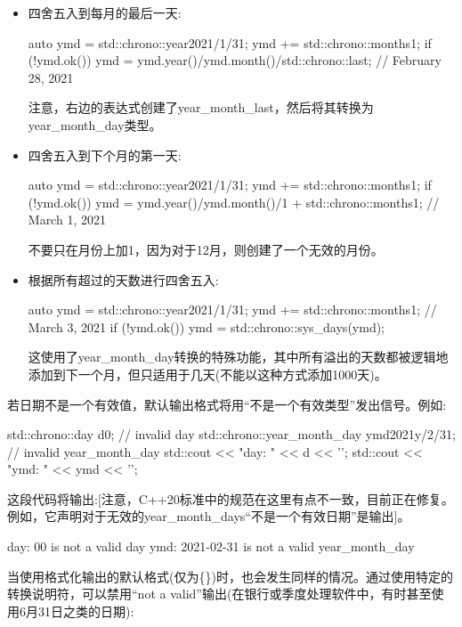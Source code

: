 \begin{itemize}
\item
四舍五入到每月的最后一天:

\begin{cpp}
auto ymd = std::chrono::year{2021}/1/31;
ymd += std::chrono::months{1};
if (!ymd.ok()) {
	ymd = ymd.year()/ymd.month()/std::chrono::last; // February 28, 2021
}
\end{cpp}

注意，右边的表达式创建了year\_month\_last，然后将其转换为year\_month\_day类型。

\item
四舍五入到下个月的第一天:

\begin{cpp}
auto ymd = std::chrono::year{2021}/1/31;
ymd += std::chrono::months{1};
if (!ymd.ok()) {
	ymd = ymd.year()/ymd.month()/1 + std::chrono::months{1}; // March 1, 2021
}
\end{cpp}

不要只在月份上加1，因为对于12月，则创建了一个无效的月份。

\item
根据所有超过的天数进行四舍五入:

\begin{cpp}
auto ymd = std::chrono::year{2021}/1/31;
ymd += std::chrono::months{1}; // March 3, 2021
if (!ymd.ok()) {
	ymd = std::chrono::sys_days(ymd);
}
\end{cpp}

这使用了year\_month\_day转换的特殊功能，其中所有溢出的天数都被逻辑地添加到下一个月，但只适用于几天(不能以这种方式添加1000天)。
\end{itemize}

若日期不是一个有效值，默认输出格式将用“不是一个有效类型”发出信号。例如:

\begin{cpp}
std::chrono::day d{0}; // invalid day
std::chrono::year_month_day ymd{2021y/2/31}; // invalid year_month_day
std::cout << "day: " << d << '\n';
std::cout << "ymd: " << ymd << '\n';
\end{cpp}

这段代码将输出:[注意，C++20标准中的规范在这里有点不一致，目前正在修复。例如，它声明对于无效的year\_month\_days“不是一个有效日期”是输出]。

\begin{shell}
day: 00 is not a valid day
ymd: 2021-02-31 is not a valid year_month_day
\end{shell}

当使用格式化输出的默认格式(仅为\{\})时，也会发生同样的情况。通过使用特定的转换说明符，可以禁用“not a valid”输出(在银行或季度处理软件中，有时甚至使用6月31日之类的日期):

